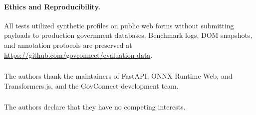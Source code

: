 \documentclass[11pt,runningheads,a4paper]{llncs}
\begin{document}
\paragraph{Ethics and Reproducibility.}
All tests utilized synthetic profiles on public web forms without submitting payloads to production government databases. Benchmark logs, DOM snapshots, and annotation protocols are preserved at \url{https://github.com/govconnect/evaluation-data}.

\begin{credits}
\subsubsection{\ackname}
The authors thank the maintainers of FastAPI, ONNX Runtime Web, and Transformers.js, and the GovConnect development team.

\subsubsection{\discintname}
The authors declare that they have no competing interests.
\end{credits}
\end{document}
